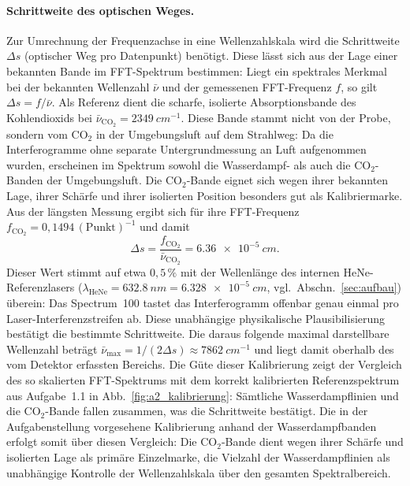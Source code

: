 \documentclass[11pt,a4paper]{article}
\begin{document}
\paragraph{Schrittweite des optischen Weges.}
Zur Umrechnung der Frequenzachse in eine Wellenzahlskala wird die Schrittweite
$\Delta s$ (optischer Weg pro Datenpunkt) benötigt. Diese lässt sich aus der
Lage einer bekannten Bande im FFT-Spektrum bestimmen: Liegt ein spektrales
Merkmal bei der bekannten Wellenzahl $\bar\nu$ und der gemessenen FFT-Frequenz
$f$, so gilt $\Delta s = f/\bar\nu$. Als Referenz dient die scharfe, isolierte
Absorptionsbande des Kohlendioxids bei
$\bar\nu_{\mathrm{CO}_2}=\SI{2349}{cm^{-1}}$. Diese Bande stammt nicht von der
Probe, sondern vom CO$_2$ in der Umgebungsluft auf dem Strahlweg: Da die
Interferogramme ohne separate Untergrundmessung an Luft aufgenommen wurden,
erscheinen im Spektrum sowohl die Wasserdampf- als auch die CO$_2$-Banden der
Umgebungsluft. Die CO$_2$-Bande eignet sich wegen ihrer bekannten Lage, ihrer
Schärfe und ihrer isolierten Position besonders gut als Kalibriermarke. Aus der
längsten Messung ergibt sich für ihre FFT-Frequenz
$f_{\mathrm{CO}_2}=0{,}1494\,(\text{Punkt})^{-1}$ und damit
\begin{equation}
  \Delta s = \frac{f_{\mathrm{CO}_2}}{\bar\nu_{\mathrm{CO}_2}}
           = \SI{6.36e-5}{cm} .
\end{equation}
Dieser Wert stimmt auf etwa $0{,}5\,\%$ mit der Wellenlänge des internen
HeNe-Referenzlasers ($\lambda_\mathrm{HeNe}=\SI{632.8}{nm}=\SI{6.328e-5}{cm}$,
vgl.\ Abschn.~\ref{sec:aufbau}) überein: Das Spectrum~100 tastet das
Interferogramm offenbar genau einmal pro Laser-Interferenzstreifen ab. Diese
unabhängige physikalische Plausibilisierung bestätigt die bestimmte
Schrittweite. Die daraus folgende maximal darstellbare Wellenzahl beträgt
$\bar\nu_{\max}=1/(2\Delta s)\approx\SI{7862}{cm^{-1}}$ und liegt damit oberhalb
des vom Detektor erfassten Bereichs. Die Güte dieser Kalibrierung zeigt der
Vergleich des so skalierten FFT-Spektrums mit dem korrekt kalibrierten
Referenzspektrum aus Aufgabe~1.1 in Abb.~\ref{fig:a2_kalibrierung}: Sämtliche
Wasserdampflinien und die CO$_2$-Bande fallen zusammen, was die Schrittweite
bestätigt. Die in der Aufgabenstellung vorgesehene Kalibrierung anhand der
Wasserdampfbanden erfolgt somit über diesen Vergleich: Die CO$_2$-Bande dient
wegen ihrer Schärfe und isolierten Lage als primäre Einzelmarke, die Vielzahl
der Wasserdampflinien als unabhängige Kontrolle der Wellenzahlskala über den
gesamten Spektralbereich.
\end{document}
